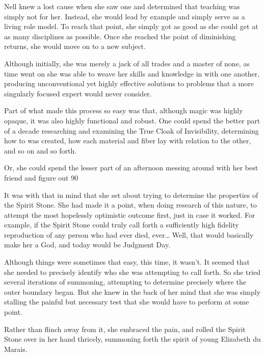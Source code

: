 Nell knew a lost cause when she saw one and determined that teaching was simply not for her. Instead, she would lead by example and simply serve as a living role model. To reach that point, she simply got as good as she could get at as many disciplines as possible. Once she reached the point of diminishing returns, she would move on to a new subject.

Although initially, she was merely a jack of all trades and a master of none, as time went on she was able to weave her skills and knowledge in with one another, producing unconventional yet highly effective solutions to problems that a more singularly focused expert would never consider.

Part of what made this process so easy was that, although magic was highly opaque, it was also highly functional and robust. One could spend the better part of a decade researching and examining the True Cloak of Invisibility, determining how to was created, how each material and fiber lay with relation to the other, and so on and so forth.

Or, she could spend the lesser part of an afternoon messing around with her best friend and figure out 90%

It was with that in mind that she set about trying to determine the properties of the Spirit Stone. She had made it a point, when doing research of this nature, to attempt the most hopelessly optimistic outcome first, just in case it worked. For example, if the Spirit Stone could truly call forth a sufficiently high fidelity reproduction of any person who had ever died, ever… Well, that would basically make her a God, and today would be Judgment Day.

Although things were sometimes that easy, this time, it wasn’t. It seemed that she needed to precisely identify who she was attempting to call forth. So she tried several iterations of summoning, attempting to determine precisely where the outer boundary began. But she knew in the back of her mind that she was simply stalling the painful but necessary test that she would have to perform at some point.

Rather than flinch away from it, she embraced the pain, and rolled the Spirit Stone over in her hand thricely, summoning forth the spirit of young Elizabeth du Marais.

